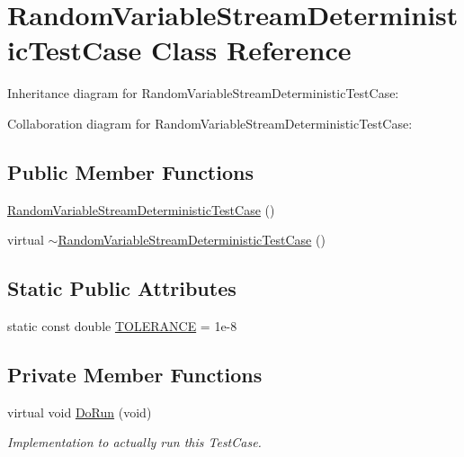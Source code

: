 \hypertarget{classRandomVariableStreamDeterministicTestCase}{}\section{Random\+Variable\+Stream\+Deterministic\+Test\+Case Class Reference}
\label{classRandomVariableStreamDeterministicTestCase}


Inheritance diagram for Random\+Variable\+Stream\+Deterministic\+Test\+Case\+:


Collaboration diagram for Random\+Variable\+Stream\+Deterministic\+Test\+Case\+:
\subsection*{Public Member Functions}
\begin{DoxyCompactItemize}
\item 
\hyperlink{classRandomVariableStreamDeterministicTestCase_ac2c186f6fb1b072399510912ca6892fe}{Random\+Variable\+Stream\+Deterministic\+Test\+Case} ()
\item 
virtual \hyperlink{classRandomVariableStreamDeterministicTestCase_a8fed60b0da275ce5e0252e02f36d932b}{$\sim$\+Random\+Variable\+Stream\+Deterministic\+Test\+Case} ()
\end{DoxyCompactItemize}
\subsection*{Static Public Attributes}
\begin{DoxyCompactItemize}
\item 
static const double \hyperlink{classRandomVariableStreamDeterministicTestCase_aa1cf92085bcc0ffa800f46707b1b29d8}{T\+O\+L\+E\+R\+A\+N\+CE} = 1e-\/8
\end{DoxyCompactItemize}
\subsection*{Private Member Functions}
\begin{DoxyCompactItemize}
\item 
virtual void \hyperlink{classRandomVariableStreamDeterministicTestCase_a4bff522d0b0939d6e6a155faaba326af}{Do\+Run} (void)
\begin{DoxyCompactList}\small\item\em Implementation to actually run this Test\+Case. \end{DoxyCompactList}\end{DoxyCompactItemize}
